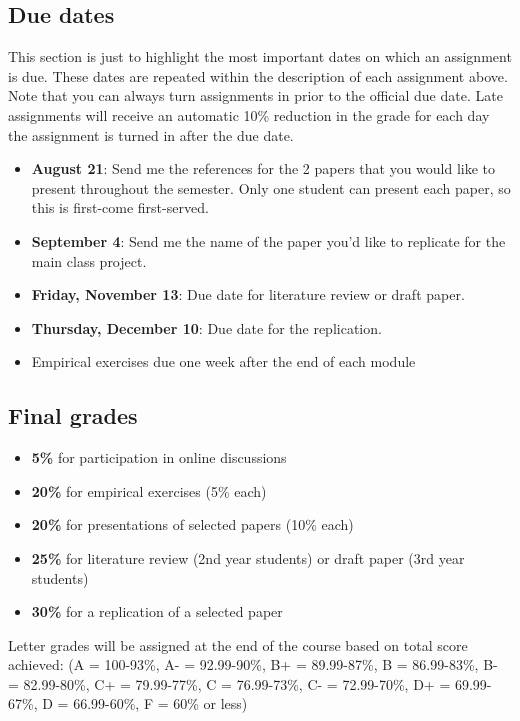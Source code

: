 \documentclass[11pt,]{article}
\providecommand{\tightlist}{%
  \setlength{\itemsep}{0pt}\setlength{\parskip}{0pt}}
\begin{document}
\hypertarget{due-dates}{%
\subsection{Due dates}\label{due-dates}}

This section is just to highlight the most important dates on which an
assignment is due. These dates are repeated within the description of
each assignment above. Note that you can always turn assignments in
prior to the official due date. Late assignments will receive an
automatic 10\% reduction in the grade for each day the assignment is
turned in after the due date.

\begin{itemize}
\tightlist
\item
  \textbf{August 21}: Send me the references for the 2 papers that you
  would like to present throughout the semester. Only one student can
  present each paper, so this is first-come first-served.
\item
  \textbf{September 4}: Send me the name of the paper you'd like to
  replicate for the main class project.
\item
  \textbf{Friday, November 13}: Due date for literature review or draft
  paper.
\item
  \textbf{Thursday, December 10}: Due date for the replication.
\item
  Empirical exercises due one week after the end of each module
\end{itemize}

\hypertarget{final-grades}{%
\subsection{Final grades}\label{final-grades}}

\begin{itemize}
\item
  \textbf{5\%} for participation in online discussions
\item
  \textbf{20\%} for empirical exercises (5\% each)
\item
  \textbf{20\%} for presentations of selected papers (10\% each)
\item
  \textbf{25\%} for literature review (2nd year students) or draft paper
  (3rd year students)
\item
  \textbf{30\%} for a replication of a selected paper
\end{itemize}

Letter grades will be assigned at the end of the course based on total
score achieved: (A = 100-93\%, A- = 92.99-90\%, B+ = 89.99-87\%, B =
86.99-83\%, B- = 82.99-80\%, C+ = 79.99-77\%, C = 76.99-73\%, C- =
72.99-70\%, D+ = 69.99-67\%, D = 66.99-60\%, F = 60\% or less)
\end{document}
